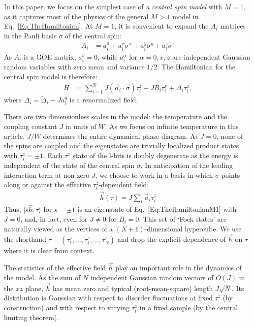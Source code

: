 \documentclass[aps,pra,twocolumn,a4paper,showpacs,superscriptaddress,floatfix,10pt]{revtex4}
\newcommand{\ket}[1]{|#1\rangle}
\begin{document}
In this paper, we focus on the simplest case of \emph{a central spin model} with $M=1$, as it captures most of the physics of the general $M>1$ model in Eq.~\eqref{Eq:TheHamiltonian}.
At $M=1$, it is convenient to expand the $A_i$ matrices in the Pauli basis $\sigma$ of the central spin:
\begin{align}
A_i &= a^0_i  + a^x_i \sigma^x + a^y_i \sigma^y + a^z_i \sigma^z
\label{Eq:GOEInPauli}
\end{align}
As $A_i$ is a GOE matrix, $a^y_i = 0$, while $a^\alpha_i$ for $\alpha=0,x,z$ are independent Gaussian random variables with zero mean and variance $1/2$.
The Hamiltonian for the central spin model is therefore:
\begin{align}
H &= \sum_{i=1}^N J(\vec{a}_i \cdot \vec{\sigma})\tau^z_i + J B_i \tau^x_i
+\Delta_i \tau^z_i ,
\label{Eq:TheHamiltonianM1}
\end{align}
where $\Delta_i = \tilde{\Delta}_i + J a^0_i$ is a renormalized field.

There are two dimensionless scales in the model: the temperature and the coupling constant $J$ in units of $W$.
As we focus on infinite temperature in this article, $J/W$ determines the entire dynamical phase diagram.
At $J=0$, none of the spins are coupled and the eigenstates are trivially localized product states with $\tau^z_i = \pm 1$.
Each $\tau^z$ state of the l-bits is doubly degenerate as the energy is independent of the state of the central spin $\sigma$.
In anticipation of the leading interaction term at non-zero $J$, we choose to work in a basis in which $\sigma$ points along or against the effective $\tau^z_i$-dependent field:
\begin{align}
\vec{h}(\tau) = J  \sum_i \vec{a}_i\tau_i^z
\end{align}
Thus, $\ket{s \hat{h}, \tau}$ for $s = \pm 1$ is an eigenstate of Eq.~\eqref{Eq:TheHamiltonianM1} with $J=0$, and, in fact, even for $J\ne  0$ for $B_i = 0$.
This set of `Fock states' are naturally viewed as the vertices of a $(N+1)$-dimensional hypercube.
We use the shorthand $\tau = (\tau^z_1,\ldots, \tau^z_i,\ldots, \tau^z_N)$ and drop the explicit dependence of $\vec{h}$ on $\tau$ where it is clear from context.

The statistics of the effective field $\vec{h}$ play an important role in the dynamics of the model.
As the sum of $N$ independent Gaussian random vectors of $O(J)$ in the $xz$ plane, $\vec{h}$ has mean zero and typical (root-mean-square) length $J\sqrt{N}$.
Its distribution is Gaussian with respect to disorder fluctuations at fixed $\tau^z$ (by construction) and with respect to varying $\tau^z_i$ in a fixed sample (by the central limiting theorem).
\end{document}
